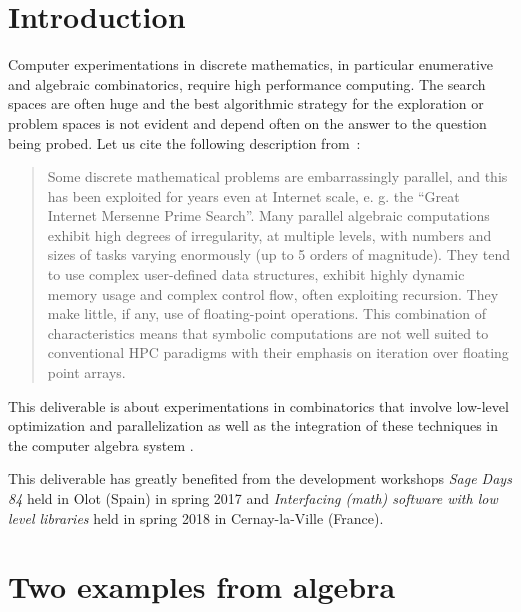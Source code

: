 \documentclass{deliverablereport}
\author{V. Delecroix, F. Hivert}
\begin{document}
\maketitle

\tableofcontents


\section{Introduction}

Computer experimentations in discrete mathematics, in particular
enumerative and algebraic combinatorics, require high performance
computing. The search spaces are often huge and the best algorithmic
strategy for the exploration or problem spaces is not evident and depend often on
the answer to the question being probed. Let us cite the following description
from~\cite{LoidlTrinder-Hecke}:
\begin{quote}{}
  Some discrete mathematical problems are embarrassingly parallel, and this
  has been exploited for years even at Internet scale, e. g. the “Great
  Internet Mersenne Prime Search”.  Many parallel algebraic computations
  exhibit high degrees of irregularity, at multiple levels, with numbers and
  sizes of tasks varying enormously (up to 5 orders of magnitude). They tend
  to use complex user-defined data structures, exhibit highly dynamic memory
  usage and complex control flow, often exploiting recursion. They make
  little, if any, use of floating-point operations.  This combination of
  characteristics means that symbolic computations are not well suited to
  conventional HPC paradigms with their emphasis on iteration over floating
  point arrays.
\end{quote}

This deliverable is about experimentations in combinatorics
that involve low-level optimization and parallelization as
well as the integration of these techniques in the computer
algebra system \Sage.

This deliverable has greatly benefited from the \ODK development
workshops \textit{Sage Days 84} held in Olot (Spain) in spring 2017
and \textit{Interfacing (math) software with low level libraries}
held in spring 2018 in Cernay-la-Ville (France).


\section{Two examples from algebra}
\end{document}

